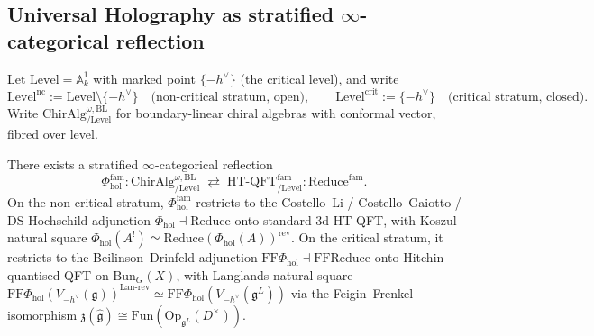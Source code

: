 \documentclass[11pt]{article}
\begin{document}
\subsection{Universal Holography as stratified $\infty$-categorical reflection}
\label{subsec:universal-holography-stratified}

Let $\mathrm{Level} = \mathbb{A}^1_k$ with marked point $\{-h^{\vee}\}$
(the critical level), and write
\[
  \mathrm{Level}^{\mathrm{nc}} := \mathrm{Level} \setminus \{-h^{\vee}\}
  \quad\text{(non-critical stratum, open)},
  \qquad
  \mathrm{Level}^{\mathrm{crit}} := \{-h^{\vee}\}
  \quad\text{(critical stratum, closed)}.
\]
Write $\mathrm{ChirAlg}^{\omega, \mathrm{BL}}_{/\mathrm{Level}}$ for
boundary-linear chiral algebras with conformal vector, fibred over
level.

\begin{theorem}
\label{thm:universal-holography-stratified}
There exists a stratified $\infty$-categorical reflection
\[
  \Phi_{\mathrm{hol}}^{\mathrm{fam}} :
  \mathrm{ChirAlg}^{\omega, \mathrm{BL}}_{/\mathrm{Level}}
  \;\rightleftarrows\;
  \mathrm{HT}\text{-}\mathrm{QFT}^{\mathrm{fam}}_{/\mathrm{Level}} :
  \mathrm{Reduce}^{\mathrm{fam}}.
\]
On the non-critical stratum, $\Phi_{\mathrm{hol}}^{\mathrm{fam}}$
restricts to the Costello--Li / Costello--Gaiotto / DS-Hochschild
adjunction $\Phi_{\mathrm{hol}} \dashv \mathrm{Reduce}$ onto
standard 3d HT-QFT, with Koszul-natural square
$\Phi_{\mathrm{hol}}(A^!) \simeq \mathrm{Reduce}(\Phi_{\mathrm{hol}}(A))^{\mathrm{rev}}$.
On the critical stratum, it restricts to the
Beilinson--Drinfeld adjunction
$\mathrm{FF}\Phi_{\mathrm{hol}} \dashv \mathrm{FF}\mathrm{Reduce}$
onto Hitchin-quantised QFT on $\mathrm{Bun}_G(X)$, with
Langlands-natural square
$\mathrm{FF}\Phi_{\mathrm{hol}}(V_{-h^{\vee}}(\mathfrak{g}))^{\mathrm{Lan\text{-}rev}}
\simeq \mathrm{FF}\Phi_{\mathrm{hol}}(V_{-h^{\vee}}(\mathfrak{g}^L))$
via the Feigin--Frenkel isomorphism
$\mathfrak{z}(\widehat{\mathfrak{g}}) \cong \mathrm{Fun}(\mathrm{Op}_{\mathfrak{g}^L}(D^{\times}))$.
\end{theorem}
\end{document}

